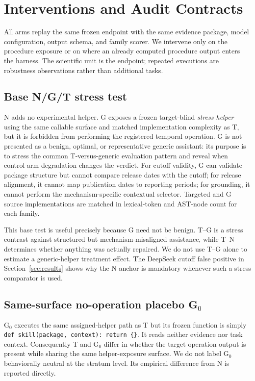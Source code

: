 \section{Interventions and Audit Contracts}
\label{sec:intervention}
All arms replay the same frozen endpoint with the same evidence package, model configuration, output schema, and family scorer. We intervene only on the procedure exposure or on where an already computed procedure output enters the harness. The scientific unit is the endpoint; repeated executions are robustness observations rather than additional tasks.

\subsection{Base N/G/T stress test}
N adds no experimental helper. G exposes a frozen target-blind \emph{stress helper} using the same callable surface and matched implementation complexity as T, but it is forbidden from performing the registered temporal operation. G is not presented as a benign, optimal, or representative generic assistant: its purpose is to stress the common T-versus-generic evaluation pattern and reveal when control-arm degradation changes the verdict. For cutoff validity, G can validate package structure but cannot compare release dates with the cutoff; for release alignment, it cannot map publication dates to reporting periods; for grounding, it cannot perform the mechanism-specific contextual selector. Targeted and G source implementations are matched in lexical-token and AST-node count for each family.

This base test is useful precisely because G need not be benign. T--G is a stress contrast against structured but mechanism-misaligned assistance, while T--N determines whether anything was actually repaired. We do not use T--G alone to estimate a generic-helper treatment effect. The DeepSeek cutoff false positive in Section~\ref{sec:results} shows why the N anchor is mandatory whenever such a stress comparator is used.

\subsection{Same-surface no-operation placebo G$_0$}
G$_0$ executes the same assigned-helper path as T but its frozen function is simply \texttt{def skill(package, context): return \{\}}. It reads neither evidence nor task context. Consequently T and G$_0$ differ in whether the target operation output is present while sharing the same helper-exposure surface. We do not label G$_0$ behaviorally neutral at the stratum level. Its empirical difference from N is reported directly.

